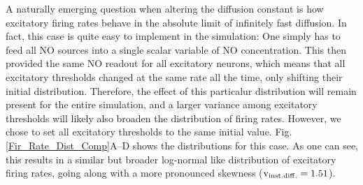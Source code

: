 \documentclass[10pt,letterpaper]{article}
\begin{document}
A naturally emerging question when altering the diffusion constant is how excitatory firing rates behave in the absolute limit of infinitely fast diffusion. In fact, this case is quite easy to implement in the simulation: One simply has to feed all NO sources into a single scalar variable of NO concentration. This then provided the same NO readout for all excitatory neurons, which means that all excitatory thresholds changed at the same rate all the time, only shifting their initial distribution. Therefore, the effect of this particalur distribution will remain present for the entire simulation, and a larger variance among excitatory thresholds will likely also broaden the distribution of firing rates. However, we chose to set all excitatory thresholds to the same initial value. Fig. \ref{Fir_Rate_Dist_Comp}A--D shows the distributions for this case. As one can see, this results in a similar but broader log-normal like distribution of excitatory firing rates, going along with a more pronounced skewness ($\mathrm{v_{\rm inst. diff.} = 1.51}$).
\end{document}
